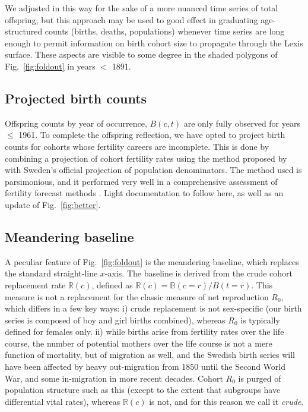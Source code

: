 We adjusted in this way for the sake of a more nuanced time series of total offspring, but this approach may be used to good effect in graduating age-structured counts (births, deaths, populations) whenever time series are long enough to permit information on birth cohort size to propagate through the Lexis surface. These aspects are visible to some degree in the shaded polygons of Fig.~\ref{fig:foldout} in years $<$ 1891.

\subsection{Projected birth counts}
\label{sec:proj}
Offspring counts by year of occurrence, $B(c,t)$ are only fully observed for years $\le$ 1961. To complete the offspring reflection, we have opted to project birth counts for cohorts whose fertility careers are incomplete. This is done by combining a projection of cohort fertility rates using the method proposed by \citet{de1985time} with Sweden's official projection of population denominators. The method used is parsimonious, and it performed very well in a comprehensive assessment of fertility forecast methods \citep{bohk2018forecast}. Light documentation to follow here, as well as an update of Fig.~\ref{fig:better}.

\subsection{Meandering baseline}
\label{sec:baseline}
A peculiar feature of Fig.~\ref{fig:foldout} is the meandering baseline, which replaces the standard straight-line $x$-axis. The baseline is derived from the crude cohort replacement rate $\mathbb{R}(c)$, defined as $\mathbb{R}(c) = \mathbb{B}(c=r) / B(t=r)$. This measure is not a replacement for the classic measure of net reproduction $R_0$, which differs in a few key ways: i) crude replacement is not sex-specific (our birth series is composed of boy and girl births combined), whereas $R_0$ is typically defined for females only. ii) while births arise from fertility rates over the life course, the number of potential mothers over the life course is not a mere function of mortality, but of migration as well, and the Swedish birth series will have been affected by heavy out-migration from 1850 until the Second World War, and some in-migration in more recent decades. Cohort $R_0$ is purged of population structure such as this (except to the extent that subgroups have differential vital rates), whereas $\mathbb{R}(c)$ is not, and for this reason we call it \emph{crude}.

